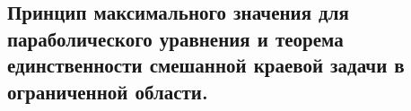 \subsection{Принцип максимального значения для параболического уравнения и теорема единственности смешанной краевой задачи в ограниченной области.}